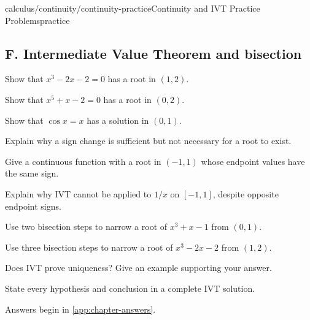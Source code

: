 \begin{webpage}{calculus/continuity/continuity-practice}{Continuity and IVT Practice Problems}{practice}
\subsection*{F. Intermediate Value Theorem and bisection}
\begin{bgexercises}[label=\textbf{5.\arabic*},resume]
  \item Show that \(x^3-2x-2=0\) has a root in \((1,2)\).
  \item Show that \(x^5+x-2=0\) has a root in \((0,2)\).
  \item Show that \(\cos x=x\) has a solution in \((0,1)\).
  \item Explain why a sign change is sufficient but not necessary for a root to exist.
  \item Give a continuous function with a root in \((-1,1)\) whose endpoint values have the same sign.
  \item Explain why IVT cannot be applied to \(1/x\) on \([-1,1]\), despite opposite endpoint signs.
  \item Use two bisection steps to narrow a root of \(x^3+x-1\) from \((0,1)\).
  \item Use three bisection steps to narrow a root of \(x^3-2x-2\) from \((1,2)\).
  \item Does IVT prove uniqueness? Give an example supporting your answer.
  \item State every hypothesis and conclusion in a complete IVT solution.
\end{bgexercises}

Answers begin in \cref{app:chapter-answers}.
\end{webpage}
